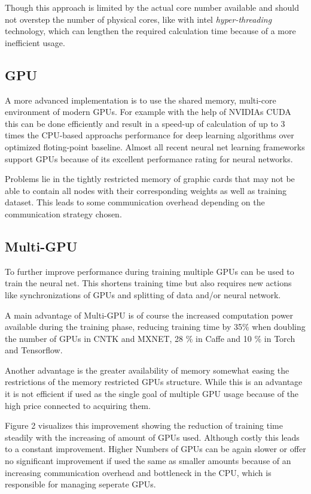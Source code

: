\documentclass[conference]{IEEEtran}
\begin{document}
Though this approach is limited by the actual core number available and should not overstep the number of physical cores, like with intel \emph{hyper-threading} technology, which can lengthen the required calculation time because of a more inefficient usage\cite{shi2016benchmarking}.


\subsection{GPU}
A more advanced implementation is to use the shared memory, multi-core environment of modern GPUs. For example with the help of  NVIDIAs CUDA this can be done efficiently and result in a speed-up of calculation of up to 3 times the CPU-based approachs performance for deep learning algorithms over optimized floting-point baseline\cite{shi2016benchmarking}. Almost all recent neural net learning frameworks support GPUs because of its excellent performance rating for neural networks.

Problems lie in the tightly restricted memory of graphic cards that may not be able to contain all nodes with their corresponding weights as well as training dataset. This leads to some communication overhead depending on the communication strategy chosen.


\subsection{Multi-GPU}
To further improve performance during training multiple GPUs can be used to train the neural net. This shortens training time but also requires new actions like synchronizations of GPUs and splitting of data and/or neural network.

A main advantage of Multi-GPU is of course the increased computation power available during the training phase, reducing training time by 35\% when doubling the number of GPUs in CNTK and MXNET, 28 \% in Caffe and 10 \% in  Torch and Tensorflow\cite{shi2016benchmarking}.

Another advantage is the greater availability of memory somewhat easing the restrictions of the memory restricted GPUs structure. While this is an advantage it is not efficient if used as the single goal of multiple GPU usage because of the high price connected to acquiring them.

Figure 2 visualizes this improvement showing the reduction of training time steadily with the increasing of amount of GPUs used. Although costly this leads to a constant improvement. Higher Numbers of GPUs can be again slower or offer no significant improvement if used the same as smaller amounts because of an increasing communication overhead and bottleneck in the CPU, which is responsible for managing seperate GPUs.
\end{document}
